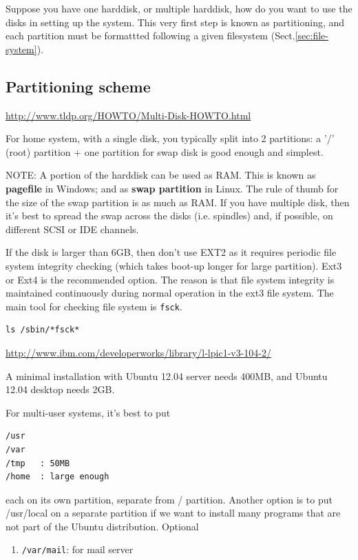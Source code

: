 Suppose you have one harddisk, or multiple harddisk, how do you want to use the
disks in setting up the system. This very first step is known as partitioning,
and each partition must be formattted following a given filesystem
(Sect.\ref{sec:file-system}).

\subsection{Partitioning scheme}
\label{sec:partition_scheme}

\url{http://www.tldp.org/HOWTO/Multi-Disk-HOWTO.html}

For home system, with a single disk, you typically split into 2 partitions:
a '/' (root) partition + one partition for swap disk is good enough and
simplest.

NOTE: A portion of the harddisk can be used as RAM. This is known as {\bf
pagefile} in Windows; and as {\bf swap partition} in Linux. The rule of thumb
for the size of the swap partition is as much as RAM. If you have multiple disk,
then it's best to spread the swap across the disks (i.e. spindles) and, if
possible, on different SCSI or IDE channels.

If the disk is larger than 6GB, then don't use EXT2 as it requires periodic file
system integrity checking (which takes boot-up longer for large partition). Ext3
or Ext4 is the recommended option. The reason is that file system integrity is
maintained continuously during normal operation in the ext3 file system. The
main tool for checking file system is \verb!fsck!.
\begin{verbatim}
ls /sbin/*fsck*
\end{verbatim}
\url{http://www.ibm.com/developerworks/library/l-lpic1-v3-104-2/}

\begin{framed}
A minimal installation with Ubuntu 12.04 server needs 400MB, and Ubuntu 12.04
desktop needs 2GB.
\end{framed}

For multi-user systems, it's best to put
\begin{verbatim}
/usr
/var
/tmp   : 50MB
/home  : large enough
\end{verbatim} 
each on its own partition, separate from / partition. Another option is to put 
/usr/local on a separate partition if we want to install many programs that are
not part of the Ubuntu distribution. Optional
\begin{enumerate}
  \item \verb!/var/mail!: for mail server
\end{enumerate}


